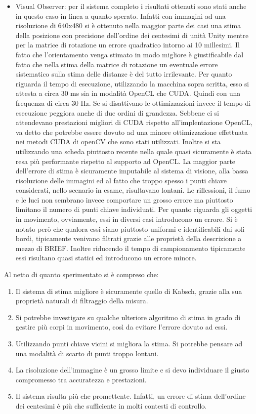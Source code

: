 \begin{itemize}
	\item Visual Observer: per il sistema completo i risultati ottenuti sono stati anche in questo caso in linea a quanto sperato. Infatti con immagini ad una risoluzione di 640x480 si è ottenuto nella maggior parte dei casi una stima della posizione con precisione dell'ordine dei centesimi di unità Unity mentre per la matrice di rotazione un errore quadratico intorno ai 10 millesimi. Il fatto che l'orientamento venga stimato in modo migliore è giustificabile dal fatto che nella stima della matrice di rotazione un eventuale errore sistematico sulla stima delle distanze è del tutto irrilevante. Per quanto riguarda il tempo di esecuzione, utilizzando la macchina sopra scritta, esso si attesta a circa 30 ms sia in modalità OpenCL che CUDA. Quindi con una frequenza di circa 30 Hz. Se si disattivano le ottimizzazioni invece il tempo di esecuzione peggiora anche di due ordini di grandezza. Sebbene ci si attendevano prestazioni migliori di CUDA rispetto all'implentazione OpenCL, va detto che potrebbe essere dovuto ad una minore ottimizzazione effettuata nei metodi CUDA di openCV che sono stati utilizzati. Inoltre si sta utilizzando una scheda piuttosto recente nella quale quasi sicuramente è stata resa più performante rispetto al supporto ad OpenCL. 
	La maggior parte dell'errore di stima è sicuramente imputabile al sistema di visione, alla bassa risoluzione delle immagini ed al fatto che troppo spesso i punti chiave considerati, nello scenario in esame, risultavano lontani. Le riflessioni, il fumo e le luci non sembrano invece comportare un grosso errore ma piuttosto limitano il numero di punti chiave individuati. Per quanto riguarda gli oggetti in movimento, ovviamente, essi in diversi casi introducono un errore. Si è notato però che qualora essi siano piuttosto uniformi e identificabili dai soli bordi, tipicamente venivano filtrati grazie alle proprietà della descrizione a mezzo di BRIEF. Inoltre riducendo il tempo di campionamento tipicamente essi risultano quasi statici ed introducono un errore minore.
\end{itemize}

Al netto di quanto sperimentato si è compreso che:
\begin{enumerate}
	\item Il sistema di stima migliore è sicuramente quello di Kabsch, grazie alla sua proprietà naturali di filtraggio della misura.
	\item Si potrebbe investigare su qualche ulteriore algoritmo di stima in grado di gestire più corpi in movimento, così da evitare l'errore dovuto ad essi.
	\item Utilizzando punti chiave vicini si migliora la stima. Si potrebbe pensare ad una modalità di scarto di punti troppo lontani.
	\item La risoluzione dell'immagine è un grosso limite e si devo individuare il giusto compromesso tra accuratezza e prestazioni.
	\item Il sistema risulta più che promettente. Infatti, un errore di stima dell'ordine dei centesimi è più che sufficiente in molti contesti di controllo.
\end{enumerate}
